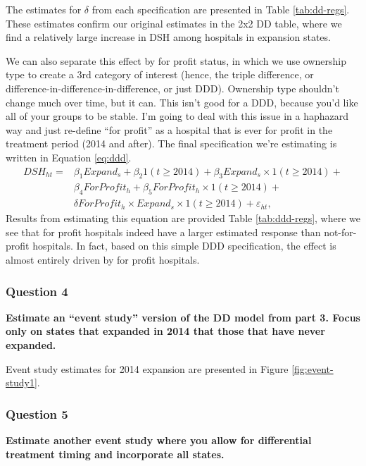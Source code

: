 \documentclass[
  12pt,
]{article}
\begin{document}
The estimates for \(\delta\) from each specification are presented in Table \ref{tab:dd-regs}. These estimates confirm our original estimates in the 2x2 DD table, where we find a relatively large increase in DSH among hospitals in expansion states.

We can also separate this effect by for profit status, in which we use ownership type to create a 3rd category of interest (hence, the triple difference, or difference-in-difference-in-difference, or just DDD). Ownership type shouldn't change much over time, but it can. This isn't good for a DDD, because you'd like all of your groups to be stable. I'm going to deal with this issue in a haphazard way and just re-define ``for profit'' as a hospital that is ever for profit in the treatment period (2014 and after). The final specification we're estimating is written in Equation \eqref{eq:ddd}.
\begin{align}
DSH_{ht} = &\beta_{1} Expand_{s} + \beta_{2} 1(t\geq 2014) + \beta_{3} Expand_{s} \times 1(t\geq 2014) + \nonumber \\
& \beta_{4} ForProfit_{h} + \beta_{5} ForProfit_{h} \times 1(t\geq 2014) + \nonumber \\
& \delta ForProfit_{h} \times Expand_{s} \times 1(t\geq 2014) +  \varepsilon_{ht}, \label{eq:ddd}
\end{align}
Results from estimating this equation are provided Table \ref{tab:ddd-regs}, where we see that for profit hospitals indeed have a larger estimated response than not-for-profit hospitals. In fact, based on this simple DDD specification, the effect is almost entirely driven by for profit hospitals.

\hypertarget{question-4}{%
\subsubsection{Question 4}\label{question-4}}

\textbf{Estimate an ``event study'' version of the DD model from part 3. Focus only on states that expanded in 2014 that those that have never expanded.}

Event study estimates for 2014 expansion are presented in Figure \ref{fig:event-study1}.

\hypertarget{question-5}{%
\subsubsection{Question 5}\label{question-5}}

\textbf{Estimate another event study where you allow for differential treatment timing and incorporate all states.}
\end{document}
